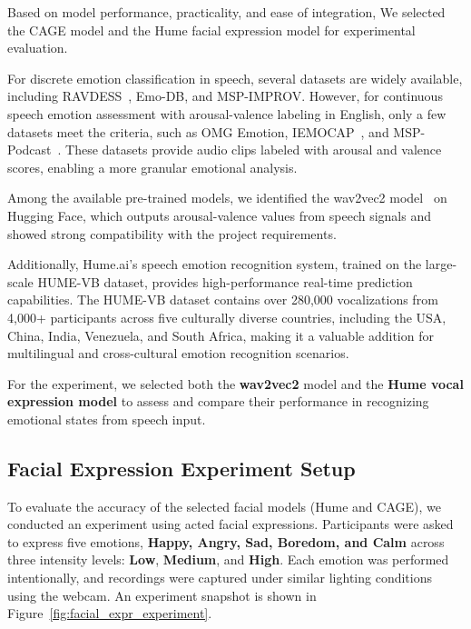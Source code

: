 Based on model performance, practicality, and ease of integration, We selected the CAGE model and the Hume facial expression model for experimental evaluation.

For discrete emotion classification in speech, several datasets are widely available, including RAVDESS~\citep{livingstone2018ryerson}, Emo-DB, and MSP-IMPROV. However, for continuous speech emotion assessment with arousal-valence labeling in English, only a few datasets meet the criteria, such as OMG Emotion, IEMOCAP~\citep{busso2008iemocap}, and MSP-Podcast~\citep{lotfian2017building}. These datasets provide audio clips labeled with arousal and valence scores, enabling a more granular emotional analysis.

Among the available pre-trained models, we identified the wav2vec2 model~\citep{wagner2023dawn} on Hugging Face, which outputs arousal-valence values from speech signals and showed strong compatibility with the project requirements.

Additionally, Hume.ai’s speech emotion recognition system, trained on the large-scale HUME-VB dataset, provides high-performance real-time prediction capabilities. The HUME-VB dataset contains over 280,000 vocalizations from 4,000+ participants across five culturally diverse countries, including the USA, China, India, Venezuela, and South Africa, making it a valuable addition for multilingual and cross-cultural emotion recognition scenarios.

For the experiment, we selected both the \textbf{wav2vec2} model and the \textbf{Hume vocal expression model} to assess and compare their performance in recognizing emotional states from speech input.


\subsection{Facial Expression Experiment Setup}

To evaluate the accuracy of the selected facial models (Hume and CAGE), we conducted an experiment using acted facial expressions. Participants were asked to express five emotions, \textbf{Happy, Angry, Sad, Boredom, and Calm} across three intensity levels: \textbf{Low}, \textbf{Medium}, and \textbf{High}. Each emotion was performed intentionally, and recordings were captured under similar lighting conditions using the webcam. An experiment snapshot is shown in Figure~\ref{fig:facial_expr_experiment}.

